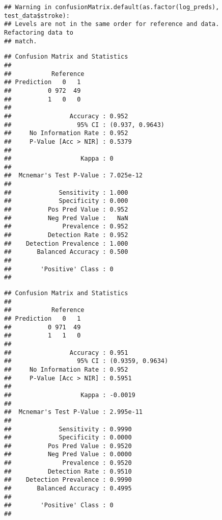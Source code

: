 \documentclass[
]{article}
\newenvironment{Shaded}{\begin{snugshade}}{\end{snugshade}}
\newcommand{\CommentTok}[1]{\textcolor[rgb]{0.56,0.35,0.01}{\textit{#1}}}
\newcommand{\FunctionTok}[1]{\textcolor[rgb]{0.13,0.29,0.53}{\textbf{#1}}}
\newcommand{\NormalTok}[1]{#1}
\newcommand{\OtherTok}[1]{\textcolor[rgb]{0.56,0.35,0.01}{#1}}
\newcommand{\SpecialCharTok}[1]{\textcolor[rgb]{0.81,0.36,0.00}{\textbf{#1}}}
\begin{document}
\begin{verbatim}
## Warning in confusionMatrix.default(as.factor(log_preds), test_data$stroke):
## Levels are not in the same order for reference and data. Refactoring data to
## match.
\end{verbatim}

\begin{verbatim}
## Confusion Matrix and Statistics
## 
##           Reference
## Prediction   0   1
##          0 972  49
##          1   0   0
##                                          
##                Accuracy : 0.952          
##                  95% CI : (0.937, 0.9643)
##     No Information Rate : 0.952          
##     P-Value [Acc > NIR] : 0.5379         
##                                          
##                   Kappa : 0              
##                                          
##  Mcnemar's Test P-Value : 7.025e-12      
##                                          
##             Sensitivity : 1.000          
##             Specificity : 0.000          
##          Pos Pred Value : 0.952          
##          Neg Pred Value :   NaN          
##              Prevalence : 0.952          
##          Detection Rate : 0.952          
##    Detection Prevalence : 1.000          
##       Balanced Accuracy : 0.500          
##                                          
##        'Positive' Class : 0              
## 
\end{verbatim}

\begin{Shaded}
\end{Shaded}

\begin{verbatim}
## Confusion Matrix and Statistics
## 
##           Reference
## Prediction   0   1
##          0 971  49
##          1   1   0
##                                           
##                Accuracy : 0.951           
##                  95% CI : (0.9359, 0.9634)
##     No Information Rate : 0.952           
##     P-Value [Acc > NIR] : 0.5951          
##                                           
##                   Kappa : -0.0019         
##                                           
##  Mcnemar's Test P-Value : 2.995e-11       
##                                           
##             Sensitivity : 0.9990          
##             Specificity : 0.0000          
##          Pos Pred Value : 0.9520          
##          Neg Pred Value : 0.0000          
##              Prevalence : 0.9520          
##          Detection Rate : 0.9510          
##    Detection Prevalence : 0.9990          
##       Balanced Accuracy : 0.4995          
##                                           
##        'Positive' Class : 0               
## 
\end{verbatim}
\end{document}
